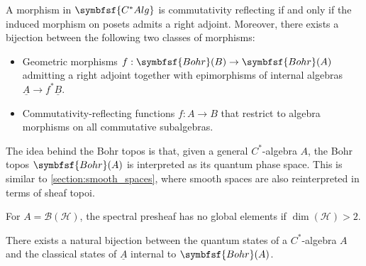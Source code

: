     \begin{property}\label{quantum:topos_morphisms}
        A morphism in $\symbfsf{C^*Alg}$ is commutativity reflecting if and only if the induced morphism on posets admits a right adjoint. Moreover, there exists a bijection between the following two classes of morphisms:
        \begin{itemize}
            \item Geometric morphisms $f:\symbfsf{Bohr}(B)\rightarrow\symbfsf{Bohr}(A)$ admitting a right adjoint together with epimorphisms of internal algebras $\underline{A}\rightarrow f^*\underline{B}$.
            \item Commutativity-reflecting functions $f:A\rightarrow B$ that restrict to algebra morphisms on all commutative subalgebras.
        \end{itemize}
    \end{property}


    The idea behind the Bohr topos is that, given a general $C^*$-algebra $A$, the Bohr topos $\symbfsf{Bohr}(A)$ is interpreted as its quantum phase space. This is similar to \cref{section:smooth_spaces}, where smooth spaces are also reinterpreted in terms of sheaf topoi.

    \begin{theorem}
        For $A=\mathcal{B}(\mathcal{H})$, the spectral presheaf has no global elements if $\dim(\mathcal{H})>2$.
    \end{theorem}

    \begin{property}
        There exists a natural bijection between the quantum states of a $C^*$-algebra $A$ and the classical states of $\underline{A}$ internal to $\symbfsf{Bohr}(A)$.
    \end{property}

